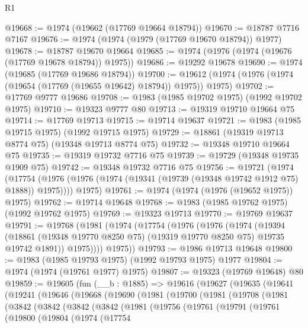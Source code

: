 \begin{lexlean}{R1}
\begin{coremodule}
@19668 := @1974 (@19662 (@17769 @19664 @18794))
@19670 := @18787 @7716 @7167
@19676 := @1974 (@1974 (@1979 (@17769 @19670 @18794)) @1977)
@19678 := @18787 @19670 @19664
@19685 := @1974 (@1976 (@1974 (@19676 (@17769 @19678 @18794)) @1975))
@19686 := @19292 @19678
@19690 := @1974 (@19685 (@17769 @19686 @18794))
@19700 := @19612 (@1974 (@1976 (@1974 (@19654 (@17769 (@19655 @19642) @18794)) @1975)) @1975)
@19702 := @17769 @9777 @19686
@19708 := @1983 (@1985 @19702 @1975) (@1992 @19702 @1975)
@19710 := @19323 @9777 @80
@19713 := @19319 @19710 @19664 @75
@19714 := @17769 @19713
@19715 := @19714 @19637
@19721 := @1983 (@1985 @19715 @1975) (@1992 @19715 @1975)
@19729 := @18861 (@19319 @19713 @8774 @75) (@19348 @19713 @8774 @75)
@19732 := @19348 @19710 @19664 @75
@19735 := @19319 @19732 @7716 @75
@19739 := @19729 (@19348 @19735 @1909 @75)
@19742 := @19348 @19732 @7716 @75
@19756 := @19721
    (@1974
      (@17754 (@1976 (@1976 (@1974 (@19341 (@19739 (@19348 @19742 @1912 @75) @1888)) @1975))))
      @1975)
@19761 := @1974 (@1974 (@1976 (@19652 @1975)) @1975)
@19762 := @19714 @19648
@19768 := @1983 (@1985 @19762 @1975) (@1992 @19762 @1975)
@19769 := @19323 @19713
@19770 := @19769 @19637
@19791 := @19768
    (@1981
      (@1974
        (@17754
          (@1976
            (@1976
              (@1974
                (@19394
                  (@18861 (@19348 @19770 @8250 @75) (@19319 @19770 @8250 @75) @19735 @19742 @1891))
                @1975))))
        @1975))
@19793 := @1986 @19713 @19648
@19800 := @1983 (@1985 @19793 @1975) (@1992 @19793 @1975) @1977
@19804 := @1974 (@1974 (@19761 @1977) @1975)
@19807 := @19323 (@19769 @19648) @80
@19859 := @19605
    (fun (__b : @1885) =>
    @19616
      (@19627
        (@19635
          (@19641
            (@19241
              (@19646
                (@19668
                  (@19690
                    (@1981
                      (@19700
                        (@1981
                          (@19708
                            (@1981
                              (@3842
                                (@3842
                                  (@3842
                                    (@3842
                                      (@1981
                                        (@19756
                                          (@19761
                                            (@19791
                                              (@19761
                                                (@19800
                                                  (@19804
                                                    (@1974
                                                      (@17754

\end{coremodule}
\end{lexlean}
